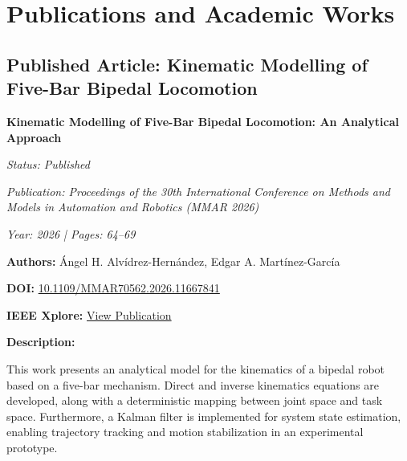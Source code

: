 \newpage
{}
{}

\section*{Publications and Academic Works}

{}

\subsection*{Published Article: Kinematic Modelling of Five-Bar Bipedal Locomotion}

\textbf{Kinematic Modelling of Five-Bar Bipedal Locomotion: An Analytical Approach}

\vspace{0.3cm}

\textit{Status: Published}

\textit{Publication: Proceedings of the 30th International Conference on Methods and Models in Automation and Robotics (MMAR 2026)}

\textit{Year: 2026 \quad | \quad Pages: 64--69}

\vspace{0.3cm}

\textbf{Authors:} Ángel H. Alvídrez-Hernández, Edgar A. Martínez-García

\vspace{0.3cm}

\textbf{DOI:} \href{https://doi.org/10.1109/MMAR70562.2026.11667841}{10.1109/MMAR70562.2026.11667841}

\textbf{IEEE Xplore:} \href{https://ieeexplore.ieee.org/document/11667841}{View Publication}

\vspace{0.5cm}

\textbf{Description:}

This work presents an analytical model for the kinematics of a bipedal robot based on a five-bar mechanism. Direct and inverse kinematics equations are developed, along with a deterministic mapping between joint space and task space. Furthermore, a Kalman filter is implemented for system state estimation, enabling trajectory tracking and motion stabilization in an experimental prototype.

\vspace{0.7cm}


